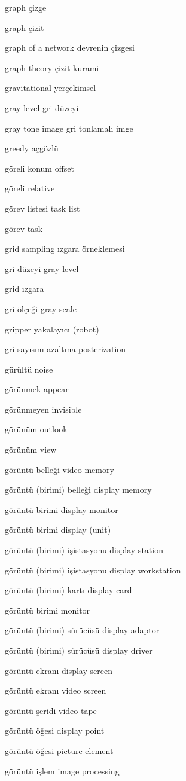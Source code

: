 \documentclass[12pt,fleqn]{article}\usepackage{../../common}
\begin{document}
graph çizge

graph çizit

graph of a network devrenin çizgesi

graph theory çizit kurami

gravitational yerçekimsel

gray level gri düzeyi

gray tone image gri tonlamalı imge

greedy açgözlü

göreli konum offset

göreli relative

görev listesi task list

görev task

grid sampling ızgara örneklemesi

gri düzeyi gray level

grid ızgara

gri ölçeği gray scale

gripper yakalayıcı (robot)

gri sayısını azaltma posterization

gürültü noise

görünmek appear

görünmeyen invisible

görünüm outlook

görünüm view

görüntü belleği video memory

görüntü (birimi) belleği display memory

görüntü birimi display monitor

görüntü birimi display (unit)

görüntü (birimi) işistasyonu display station

görüntü (birimi) işistasyonu display workstation

görüntü (birimi) kartı display card

görüntü birimi monitor

görüntü (birimi) sürücüsü display adaptor

görüntü (birimi) sürücüsü display driver

görüntü ekranı display screen

görüntü ekranı video screen

görüntü şeridi video tape

görüntü öğesi display point

görüntü öğesi picture element

görüntü işlem image processing
\end{document}
